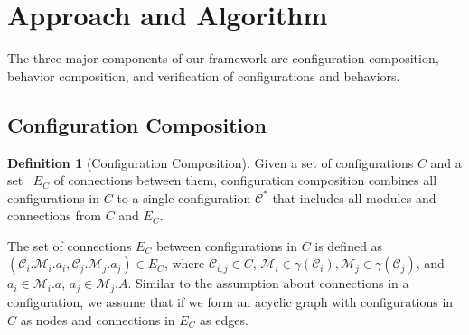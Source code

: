 \documentclass[conference]{IEEEtran}
\theoremstyle{definition}
\newtheorem{definition}{Definition}[section]
\begin{document}
\section{Approach and Algorithm}
\label{sec:approach}
The three major components of our framework are configuration composition, behavior
composition, and verification of configurations and behaviors. 
\subsection{Configuration Composition} \label{sec:conf_composition}


\begin{definition}[Configuration Composition]
Given a set of configurations $C$ %
and a set \ $E_C$ of connections between them, configuration composition
combines all configurations in $C$ to a single configuration $\mathcal{C}^*$
that
includes all modules and
connections from $C$ and $E_C$.%
\end{definition}
The set of connections $E_C$ between configurations in $C$ is defined as $(\mathcal{C}_i.\mathcal{M}_i.a_i, \mathcal{C}_j.\mathcal{M}_j.a_j) \in E_C$, where $\mathcal{C}_{i,j}\in C$, $\mathcal{M}_i \in \gamma(\mathcal{C}_i), \mathcal{M}_j \in \gamma(\mathcal{C}_j)$, and $a_i\in \mathcal{M}_i.a$, $a_j\in \mathcal{M}_j.A$. Similar to the assumption about connections in a configuration, we assume that if we form an
acyclic graph with configurations in $C$ as nodes and connections in $E_C$ as edges.
\end{document}
